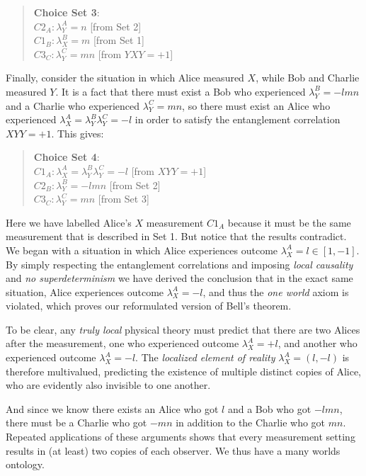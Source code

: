 \documentclass[12pt]{article}
\begin{document}
\begin{quote}
\textbf{Choice Set 3}:\\
$C2_A: \lambda_Y^A = n$ [from Set 2]\\
$C1_B: \lambda_X^B = m$ [from Set 1]\\ 
$C3_C: \lambda_Y^C = mn$ [from $YXY=+1$]
\end{quote}

Finally, consider the situation in which Alice measured $X$, while Bob and Charlie measured $Y$.  It is a fact that there must exist a Bob who experienced $\lambda_Y^B = -lmn$ and a Charlie who experienced $\lambda_Y^C = mn$, so there must exist an Alice who experienced $\lambda_X^A = \lambda_Y^B\lambda_Y^C = -l$ in order to satisfy the entanglement correlation $XYY = +1$. This gives:

\begin{quote}
\textbf{Choice Set 4}:\\
$C1_A: \lambda_X^A = \lambda_Y^B\lambda_Y^C = -l$ [from $XYY=+1$]\\
$C2_B: \lambda_Y^B = -lmn$ [from Set 2]\\ 
$C3_C: \lambda_Y^C = mn$ [from Set 3]
\end{quote}

Here we have labelled Alice's $X$ measurement $C1_A$ because it must be the same measurement that is described in Set 1. But notice that the results contradict. We began with a situation in which Alice experiences outcome $\lambda_X^A = l \in [1,-1]$. By simply respecting the entanglement correlations and imposing \textit{local causality} and \textit{no superdeterminism} we have derived the conclusion that in the exact same situation, Alice experiences outcome $\lambda_X^A = -l$, and thus the \textit{one world} axiom is violated, which proves our reformulated version of Bell's theorem.

To be clear, any \textit{truly local} physical theory must predict that there are two Alices after the measurement, one who experienced outcome $\lambda_X^A = +l$, and another who experienced outcome $\lambda_X^A = -l$. The \textit{localized element of reality} $\lambda_X^A = (l,-l)$ is therefore multivalued, predicting the existence of multiple distinct copies of Alice, who are evidently also invisible to one another.

And since we know there exists an Alice who got $l$ and a Bob who got $-lmn$, there must be a Charlie who got $-mn$ in addition to the Charlie who got $mn$. Repeated applications of these arguments shows that every measurement setting results in (at least) two copies of each observer. We thus have a many worlds ontology.
\end{document}
